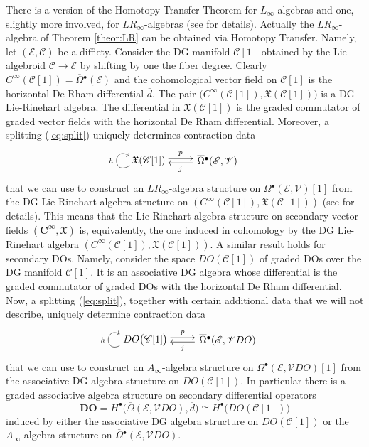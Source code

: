 \documentclass{conm-p-l}
\theoremstyle{definition}
\theoremstyle{remark}
\numberwithin{equation}{section}
\begin{document}
There is a version of the Homotopy Transfer Theorem for $L_\infty$-algebras \cite{h10, v14} and one, slightly more involved, for $LR_\infty$-algebras (see \cite{v12} for details). Actually the $LR_\infty$-algebra of Theorem \ref{theor:LR} can be obtained via Homotopy Transfer. Namely, let $(\mathscr E, \mathscr C)$ be a diffiety. Consider the DG manifold $\mathscr C [1]$ obtained by the Lie algebroid $\mathscr C \to \mathscr E$ by shifting by one the fiber degree. Clearly $C^\infty (\mathscr C [1]) = \overline \Omega{}^\bullet (\mathscr E)$ and the cohomological vector field on $\mathscr C[1]$ is the horizontal De Rham differential $\overline d$. The pair $\big(C^\infty (\mathscr C[1]), \mathfrak X (\mathscr C[1])\big)$ is a DG Lie-Rinehart algebra. The differential in $\mathfrak X (\mathscr C[1])$ is the graded commutator of graded vector fields with the horizontal De Rham differential. Moreover, a splitting (\ref{eq:split}) uniquely determines contraction data
\begin{equation}%
\xymatrix{     *{ \quad \quad \quad \mathfrak X (\mathscr C[1]) \ }
\ar@(dl,ul)[]^-{h}\
\ar@<0.5ex>[r]^-{p} & *{\ \,
\overline \Omega{}^\bullet (\mathscr E, \mathscr V) \quad\ \  \ \quad}  \ar@<0.5ex>[l]^-{j}}
\end{equation}
that we can use to construct an $LR_\infty$-algebra structure on $\overline \Omega{}^\bullet (\mathscr E, \mathscr V)[1]$ from the DG Lie-Rinehart algebra structure on $(C^\infty (\mathscr C[1]), \mathfrak X (\mathscr C[1]))$ (see \cite{v12} for details). This means that the Lie-Rinehart algebra structure on secondary vector fields $(\boldsymbol{C}^\infty, \boldsymbol{\mathfrak X})$ is, equivalently, the one induced in cohomology by the DG Lie-Rinehart algebra $(C^\infty (\mathscr C[1]), \mathfrak X (\mathscr C[1]))$. A similar result holds for secondary DOs. Namely, consider the space $DO(\mathscr C[1])$ of graded DOs over the DG manifold $\mathscr C[1]$. It is an associative DG algebra whose differential is the graded commutator of graded DOs with the horizontal De Rham differential. Now, a splitting (\ref{eq:split}), together with certain additional data that we will not describe, uniquely determine contraction data
\begin{equation}%
\xymatrix{     *{ \quad \quad \quad \quad DO \big(\mathscr C[1]\big) \ }
\ar@(dl,ul)[]^-{h}\
\ar@<0.5ex>[r]^-{p} & *{\ \,
\overline \Omega{}^\bullet (\mathscr E, \mathscr V DO) \quad\ \  \ \quad}  \ar@<0.5ex>[l]^-{j}}
\end{equation}
that we can use to construct an $A_\infty$-algebra structure on  $\overline \Omega{}^\bullet (\mathscr E, \mathscr V DO)[1]$ from the associative DG algebra structure on $DO(\mathscr C[1])$. In particular there is a graded associative algebra structure on secondary differential operators
\[
\boldsymbol{DO} = H^\bullet \big(\overline \Omega (\mathscr E, \mathscr V DO), \overline d\big) \cong H^\bullet \big( DO (\mathscr C[1]) \big)
\]
induced by either the associative DG algebra structure on $DO (\mathscr C[1])$ or the $A_\infty$-algebra structure on $\overline \Omega{}^\bullet (\mathscr E, \mathscr V DO)$.
\end{document}
